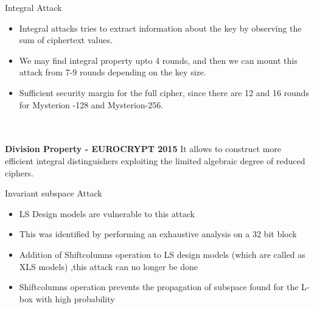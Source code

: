 \begin{frame}{Integral Attack}

    \begin{itemize}
        \item Integral attacks tries to extract information about the key by observing the sum of ciphertext values.
        \item We may find integral property upto 4 rounds, and then we can mount this attack from 7-9 rounds depending on the key size. 
        \item Sufficient security margin for the full cipher, since there are 12 and 16 rounds for Mysterion -128 and Mysterion-256.
    \end{itemize}
\\\\
\textbf{Division Property - EUROCRYPT 2015}
It allows to construct more efficient integral distinguishers exploiting the limited algebraic degree of reduced ciphers.

\end{frame}

\begin{frame}{Invariant subspace Attack}
\begin{itemize}
    \item LS Design models are vulnerable to this attack 
    \item This was identified by performing an exhaustive analysis on a 32 bit block
    \item Addition of Shiftcolumns operation to LS design models (which are called as XLS models) ,this attack can no longer be done 
    \item Shiftcolumns operation prevents the propagation of subspace found for the L-box with high probability
\end{itemize}

\end{frame}
